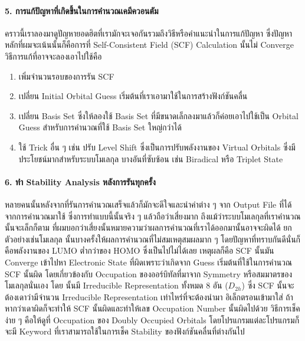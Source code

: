\paragraph{5. การแก้ปัญหาที่เกิดขึ้นในการคำนวณเคมีควอนตัม}
คราวนี้เราลองมาดูปัญหายอดฮิตที่เรามักจะเจอกันรวมถึงวิธีหรือคำแนะนำในการแก้ปัญหา ซึ่งปัญหาหลักที่ผมจะเน้นนั้นก็คือการที่ Self-Consistent Field
(SCF) Calculation นั้นไม่ Converge วิธีการแก้ที่อาจจะลองเอาไปใช้คือ

\begin{enumerate}
  \item เพิ่มจำนวนรอบของการรัน SCF

  \item เปลี่ยน Initial Orbital Guess เริ่มต้นที่เราเอามาใช้ในการสร้างฟังก์ชันคลื่น

  \item เปลี่ยน Basis Set ซึ่งให้ลองใช้ Basis Set ที่มีขนาดเล็กลงมาแล้วก็ค่อยเอาไปใช้เป็น Orbital Guess สำหรับการคำนวณที่ใช้
        Basis Set ใหญ่กว่าได้

  \item ใช้ Trick อื่น ๆ เช่น ปรับ Level Shift ซึ่งเป็นการปรับพลังงานของ Virtual Orbitals ซึ่งมีประโยชน์มากสำหรับระบบโมเลกุล%
        บางอันที่ซับซ้อน เช่น Biradical หรือ Triplet State
\end{enumerate}

\paragraph{6. ทำ Stability Analysis หลังการรันทุกครั้ง}
หลายคนนั้นหลังจากที่รันการคำนวณเสร็จแล้วก็มักจะดีใจและนำค่าต่าง ๆ จาก Output File ที่ได้จากการคำนวณมาใช้ ซึ่งการทำแบบนี้นั้นจริง ๆ
แล้วถือว่าเสี่ยงมาก ถึงแม้ว่าระบบโมเลกุลที่เราคำนวณนั้นจะเล็กก็ตาม ที่ผมบอกว่าเสี่ยงนั้นหมายความว่าผลการคำนวณที่เราได้ออกมานั้นอาจจะผิดได้
ยกตัวอย่างเช่นโมเลกุล  นั้นบางครั้งให้ผลการคำนวณที่ไม่สมเหตุสมผลมาก ๆ โดยปัญหาที่ทราบกันดีนั่นก็คือพลังงานของ LUMO ต่ำกว่าของ
HOMO ซึ่งเป็นไปไม่ได้เลย เหตุผลก็คือ SCF นั้นมัน Converge เข้าไปหา Electronic State ที่ผิดเพราะว่าเกิดจาก Guess เริ่มต้นที่ใช้ในการคำนวณ
SCF นั้นผิด โดยเกี่ยวข้องกับ Occupation ของออร์บิทัลที่มาจาก Symmetry หรือสมมาตรของโมเลกุลนั่นเอง โดย  นั้นมี Irreducible
Representation ทั้งหมด 8 อัน ($D_{2h}$) ซึ่ง SCF นั้นจะต้องเดาว่ามีจำนวน Irreducible Representation เท่าไหร่ที่จะต้องนำมา%
อิเล็กตรอนเข้ามาใส่ ถ้าหากว่าเดาผิดก็จะทำให้ SCF นั้นผิดและทำให้เลข Occupation Number นั้นผิดไปด้วย วิธีการเช็คง่าย ๆ คือให้ดูที่
Occupation ของ Doubly Occupied Orbitals โดยโปรแกรมแต่ละโปรแกรมก็จะมี Keyword ที่เราสามารถใช้ในการเช็ค Stability
ของฟังก์ชันคลื่นที่ต่างกันไป

